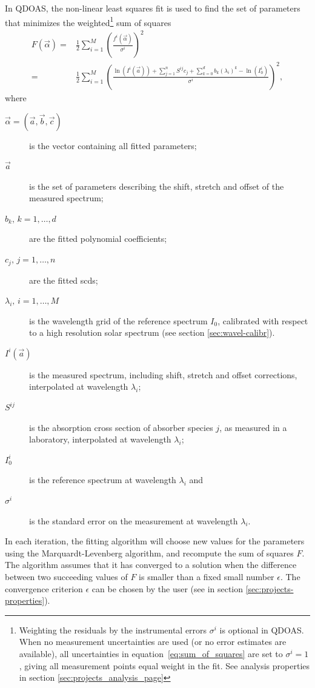 In QDOAS, the non-linear least squares fit is used to find the set of parameters that
minimizes the weighted\footnote{Weighting the residuals by the
  instrumental errors $\sigma^i$ is optional in QDOAS.  When no
  measurement uncertainties are used (or no error estimates are
  available), all uncertainties in equation~\eqref{eq:sum_of_squares}
  are set to $\sigma^i=1$, giving all measurement points equal weight
  in the fit.  See analysis properties in section
  \ref{sec:projects_analysis_page}} sum of squares
\begin{align}
  F(\vec{\alpha}) = & \frac{1}{2} \sum_{i=1}^M\left(
    \frac{f^i(\vec{\alpha})}{\sigma^i}
    \right)^2 \nonumber \\
    = &\frac{1}{2} \sum_{i=1}^M
  \left(
    \frac{\ln(I^i(\vec{a}))+\sum_{j=1}^{n}S^{ij} c_j + \sum_{k=0}^d
      b_k (\lambda_i)^k -\ln(I^i_0)}{\sigma^i}
  \right)^2,  \label{eq:sum_of_squares}
\end{align}
where
\begin{description}
\item[$\vec{\alpha}=(\vec{a},\vec{b},\vec{c})$] is the vector
  containing all fitted parameters;
\item[$\vec{a}$] is the set of parameters describing the shift,
  stretch and offset of the measured spectrum;
\item[$b_k,\, k=1,\ldots,d$] are the fitted polynomial coefficients;
\item[$c_j,\, j=1,\ldots,n$] are the fitted \glspl{scd};
\item[$\lambda_i,\, i=1,\ldots,M$] is the wavelength grid of the
  reference spectrum $I_0$, calibrated with respect to a high
  resolution solar spectrum (see section \ref{sec:wavel-calibr}).
\item[$I^i(\vec{a})$] is the measured spectrum, including shift,
  stretch and offset corrections, interpolated at wavelength
  $\lambda_i$;
\item[$S^{ij}$] is the absorption cross section of absorber species
  $j$, as measured in a laboratory, interpolated at wavelength
  $\lambda_i$;
\item[$I^i_0$] is the reference spectrum at wavelength $\lambda_i$ and
\item[$\sigma^i$] is the standard error on the measurement at
  wavelength $\lambda_i$.
\end{description}
In each iteration, the fitting algorithm will choose new values for
the parameters using the Marquardt-Levenberg algorithm, and recompute
the sum of squares $F$.  The algorithm assumes that it has converged
to a solution when the difference between two succeeding values of $F$
is smaller than a fixed small number $\epsilon$.  The convergence
criterion $\epsilon$ can be chosen by the user (see
 in section \ref{sec:projects-properties}).

